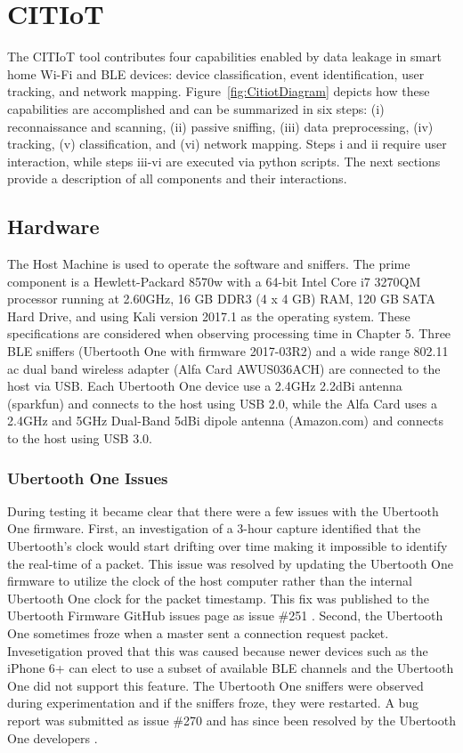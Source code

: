 \documentclass[12pt,letterpaper,oneside]{book}
\begin{document}
			\tableBtleDevicesShort
		
		\section{\acf{CITIoT}}
		The \ac{CITIoT} tool contributes four capabilities enabled by data leakage in smart home Wi-Fi and \ac{BLE} devices: device classification, event identification, user tracking, and network mapping. Figure~\ref{fig:CitiotDiagram} depicts how these capabilities are accomplished and can be summarized in six steps: (i) reconnaissance and scanning, (ii) passive sniffing, (iii) data preprocessing, (iv) tracking, (v) classification, and (vi) network mapping. Steps i and ii require user interaction, while steps iii-vi are executed via python scripts. The next sections provide a description of all components and their interactions.
		
		\figCitiotDiagram
		
			\subsection{Hardware}
			The Host Machine is used to operate the software and sniffers. The prime component is a Hewlett-Packard 8570w with a 64-bit Intel Core i7 3270QM processor running at 2.60GHz, 16 GB DDR3 (4 x 4 GB) RAM, 120 GB SATA Hard Drive, and using Kali version 2017.1 as the operating system. These specifications are considered when observing processing time in Chapter 5. Three \ac{BLE} sniffers (Ubertooth One with firmware 2017-03R2) and a wide range 802.11 ac dual band wireless adapter (Alfa Card AWUS036ACH) are connected to the host via \ac{USB}. Each Ubertooth One device use a 2.4GHz 2.2dBi antenna (sparkfun) and connects to the host using \ac{USB} 2.0, while the Alfa Card uses a 2.4GHz and 5GHz Dual-Band 5dBi dipole antenna (Amazon.com) and connects to the host using \ac{USB} 3.0.
			
			\subsubsection{Ubertooth One Issues}
			During testing it became clear that there were a few issues with the Ubertooth One firmware. First, an investigation of a 3-hour capture identified that the Ubertooth's clock would start drifting over time making it impossible to identify the real-time of a packet. This issue was resolved by updating the Ubertooth One firmware to utilize the clock of the host computer rather than the internal Ubertooth One clock for the packet timestamp. This fix was published to the Ubertooth Firmware GitHub issues page as issue \#251 \cite{}. Second, the Ubertooth One sometimes froze when a master sent a connection request packet. Invesetigation proved that this was caused because newer devices such as the iPhone 6+ can elect to use a subset of available \ac{BLE} channels and the Ubertooth One did not support this feature. The Ubertooth One sniffers were observed during experimentation and if the sniffers froze, they were restarted. A bug report was submitted as issue \#270 and has since been resolved by the Ubertooth One developers \cite{}.
			
\end{document}
